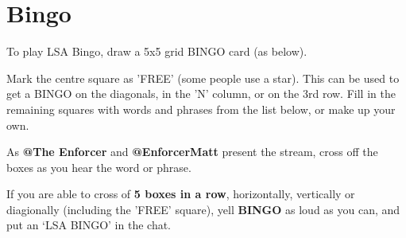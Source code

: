 \section{Bingo}

To play LSA Bingo, draw a 5x5 grid BINGO card (as below). 

Mark the centre square as 'FREE' (some people use a star). 
This can be used to get a BINGO on the diagonals, in the 'N' column, or on the 3rd row.
Fill in the remaining squares with words and phrases from the list below, or make up
your own.

As \textbf{@The Enforcer} and \textbf{@EnforcerMatt} present the stream, cross off the boxes as you 
hear the word or phrase.

If you are able to cross of \textbf{5 boxes in a row}, horizontally, vertically or diagionally 
(including the 'FREE' square), yell \textbf{BINGO} as loud as you can, and put an `LSA BINGO' in the chat.

